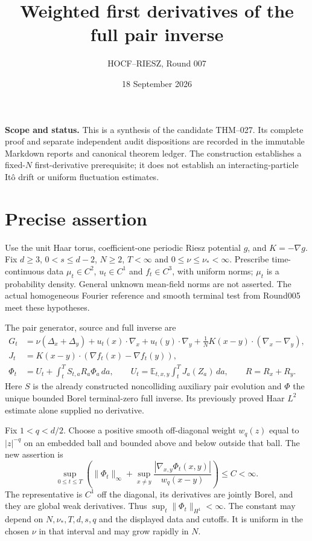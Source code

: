 \documentclass[10pt]{article}
\title{Weighted first derivatives of the full pair inverse}
\author{HOCF--RIESZ, Round 007}
\date{18 September 2026}
\newcommand{\E}{\mathbb E}
\begin{document}
\maketitle
\noindent\textbf{Scope and status.} This is a synthesis of the candidate THM--027.
Its complete proof and separate independent audit dispositions are recorded in
the immutable Markdown reports and canonical theorem ledger. The construction
establishes a fixed-$N$ first-derivative prerequisite; it does not establish
an interacting-particle It\^o drift or uniform fluctuation estimates.

\section*{Precise assertion}
Use the unit Haar torus, coefficient-one periodic Riesz potential $g$, and
$K=-\nabla g$. Fix $d\ge3$, $0<s\le d-2$, $N\ge2$, $T<\infty$ and
$0\le\nu\le\nu_*<\infty$. Prescribe time-continuous data
$\mu_t\in C^2$, $u_t\in C^1$ and $f_t\in C^3$, with uniform norms;
$\mu_t$ is a probability density. General unknown mean-field norms are not
asserted. The actual homogeneous Fourier reference and smooth terminal test
from Round005 meet these hypotheses.

The pair generator, source and full inverse are
\begin{align*}
 G_t&=\nu(\Delta_x+\Delta_y)+u_t(x)\cdot\nabla_x+u_t(y)\cdot\nabla_y
       +\frac1N K(x-y)\cdot(\nabla_x-\nabla_y),\\
 J_t&=K(x-y)\cdot(\nabla f_t(x)-\nabla f_t(y)),\\
 \Phi_t&=U_t+\int_t^T S_{t,a}R_a\Phi_a\,da,
 \qquad U_t=\E_{t,x,y}\int_t^T J_a(Z_a)\,da,\qquad R=R_x+R_y.
\end{align*}
Here $S$ is the already constructed noncolliding auxiliary pair evolution and
$\Phi$ the unique bounded Borel terminal-zero full inverse. Its previously
proved Haar $L^2$ estimate alone supplied no derivative.

Fix $1<q<d/2$. Choose a positive smooth off-diagonal weight $w_q(z)$ equal to
$|z|^{-q}$ on an embedded ball and bounded above and below outside that ball.
The new assertion is
\[
 \sup_{0\le t\le T}\left(\|\Phi_t\|_\infty+
       \sup_{x\ne y}\frac{|\nabla_{x,y}\Phi_t(x,y)|}{w_q(x-y)}\right)
 \le C<\infty.
\]
The representative is $C^1$ off the diagonal, its derivatives are jointly Borel,
and they are global weak derivatives. Thus $\sup_t\|\Phi_t\|_{H^1}<\infty$.
The constant may depend on $N,\nu_*,T,d,s,q$ and the displayed data and cutoffs.
It is uniform in the chosen $\nu$ in that interval and may grow rapidly in $N$.
\end{document}
